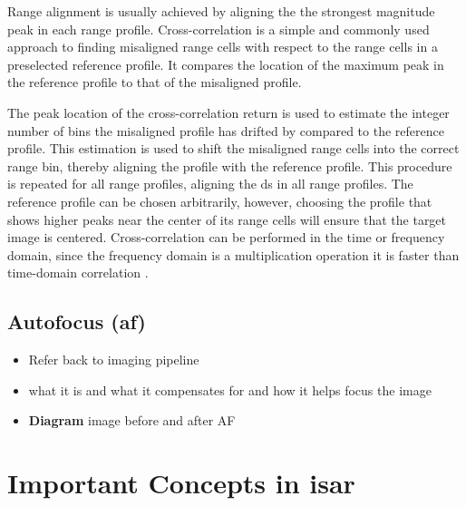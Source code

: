 \documentclass[class=report,11pt,crop=false]{standalone}
\begin{document}
    
    Range alignment is usually achieved by aligning the the strongest magnitude peak in each range profile. Cross-correlation is a simple and commonly used approach to finding misaligned range cells with respect to the range cells in a preselected reference profile. It compares the location of the maximum peak in the reference profile to that of the misaligned profile.
    
    The peak location of the cross-correlation return is used to estimate the integer number of bins the misaligned profile has drifted by compared to the reference profile. This estimation is used to shift the misaligned range cells into the correct range bin, thereby aligning the profile with the reference profile. This procedure is repeated for all range profiles, aligning the \gls{ds} in all range profiles. The reference profile can be chosen arbitrarily, however, choosing the profile that shows higher peaks near the center of its range cells will ensure that the target image is centered. Cross-correlation can be performed in the time or frequency domain, since the frequency domain is a multiplication operation it is faster than time-domain correlation \cite{ISARtextbook_Martorella}. %

    \subsection{Autofocus (\gls{af})} 
    \begin{itemize}
        \item Refer back to imaging pipeline
        \item what it is and what it compensates for and how it helps focus the image
        \item \textbf{Diagram} image before and after AF
    \end{itemize}

\section{Important Concepts in \gls{isar}} \label{sec:theory_isar_complications}

\end{document}
